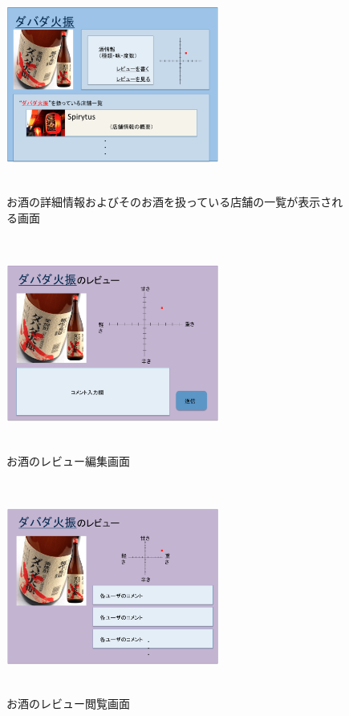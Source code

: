 \documentclass[a4j,titlepage]{jarticle}
\begin{document}
\begin {figure}[htbp]
    \begin{center}
    \includegraphics [height=7cm, width=7cm]{extrnal_design_document_image/14.eps}
    \caption {お酒の詳細情報およびそのお酒を扱っている店舗の一覧が表示される画面}
    \label {fig:14}
    \end{center}
\end {figure}

\begin {figure}[htbp]
    \begin{center}
    \includegraphics [height=7cm, width=7cm]{extrnal_design_document_image/15.eps}
    \caption {お酒のレビュー編集画面}
    \label {fig:15}
    \end{center}
\end {figure}

\begin {figure}[htbp]
    \begin{center}
    \includegraphics [height=7cm, width=7cm]{extrnal_design_document_image/16.eps}
    \caption {お酒のレビュー閲覧画面}
    \label {fig:16}
    \end{center}
\end {figure}
\end{document}
